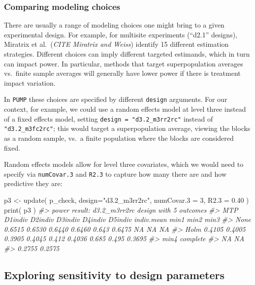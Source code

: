 \documentclass[
]{article}
\newenvironment{Shaded}{\begin{snugshade}}{\end{snugshade}}
\newcommand{\AttributeTok}[1]{\textcolor[rgb]{0.77,0.63,0.00}{#1}}
\newcommand{\CommentTok}[1]{\textcolor[rgb]{0.56,0.35,0.01}{\textit{#1}}}
\newcommand{\DecValTok}[1]{\textcolor[rgb]{0.00,0.00,0.81}{#1}}
\newcommand{\FloatTok}[1]{\textcolor[rgb]{0.00,0.00,0.81}{#1}}
\newcommand{\FunctionTok}[1]{\textcolor[rgb]{0.00,0.00,0.00}{#1}}
\newcommand{\NormalTok}[1]{#1}
\newcommand{\OtherTok}[1]{\textcolor[rgb]{0.56,0.35,0.01}{#1}}
\newcommand{\StringTok}[1]{\textcolor[rgb]{0.31,0.60,0.02}{#1}}
\begin{document}
\subsubsection{Comparing modeling choices}

There are usually a range of modeling choices one might bring to a given
experimental design. For example, for multisite experiments (``d2.1''
designs), Miratrix et al.~(\emph{CITE Miratrix and Weiss}) identify 15
different estimation strategies. Different choices can imply different
targeted estimands, which in turn can impact power. In particular,
methods that target superpopulation averages vs.~finite sample averages
will generally have lower power if there is treatment impact variation.

In \texttt{PUMP} these choices are specified by different
\texttt{design} arguments. For our context, for example, we could use a
random effects model at level three instead of a fixed effects model,
setting \texttt{design\ =\ "d3.2\_m3rr2rc"} instead of
\texttt{"d3.2\_m3fc2rc"}; this would target a superpopulation average,
viewing the blocks as a random sample, vs.~a finite population where the
blocks are considered fixed.

Random effects models allow for level three covariates, which we would
need to specify via \texttt{numCovar.3} and \texttt{R2.3} to capture how
many there are and how predictive they are:

\begin{Shaded}
\begin{Highlighting}[]
\NormalTok{p3 }\OtherTok{\textless{}{-}} \FunctionTok{update}\NormalTok{( p\_check, }\AttributeTok{design=}\StringTok{"d3.2\_m3rr2rc"}\NormalTok{, }\AttributeTok{numCovar.3 =} \DecValTok{3}\NormalTok{, }\AttributeTok{R2.3 =} \FloatTok{0.40}\NormalTok{ )}
\FunctionTok{print}\NormalTok{( p3 )}
\CommentTok{\#\textgreater{} power result: d3.2\_m3rr2rc design with 5 outcomes}
\CommentTok{\#\textgreater{}   MTP D1indiv D2indiv D3indiv D4indiv D5indiv indiv.mean  min1  min2   min3}
\CommentTok{\#\textgreater{}  None  0.6515  0.6530  0.6440  0.6460   0.643     0.6475    NA    NA     NA}
\CommentTok{\#\textgreater{}  Holm  0.4105  0.4005  0.3905  0.4045   0.412     0.4036 0.685 0.495 0.3695}
\CommentTok{\#\textgreater{}    min4 complete}
\CommentTok{\#\textgreater{}      NA       NA}
\CommentTok{\#\textgreater{}  0.2755   0.2575}
\end{Highlighting}
\end{Shaded}

\subsection{Exploring sensitivity to design parameters}
\end{document}
